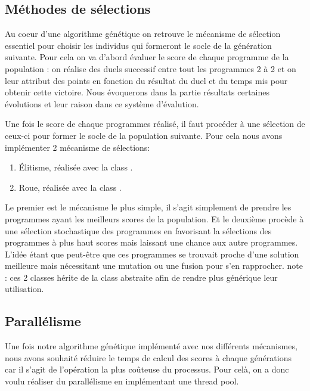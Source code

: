 \documentclass[a4paper,12pt]{article} %
\begin{document}
\subsection{Méthodes de sélections}
Au coeur d'une algorithme génétique on retrouve le mécanisme de sélection essentiel pour choisir les individus qui formeront le socle de la génération suivante.
Pour cela on va d'abord évaluer le score de chaque programme de la population : on réalise des duels successif entre tout les programmes 2 à 2 et on leur attribut des points en fonction du résultat du duel et du temps mis pour obtenir cette victoire. Nous évoquerons dans la partie résultats certaines évolutions et leur raison dans ce système d'évalution.

Une fois le score de chaque programmes réalisé, il faut procéder à une sélection de ceux-ci pour former le socle de la population suivante. Pour cela nous avons implémenter 2 mécanisme de sélections:

\begin{enumerate}
	\item Élitisme, réalisée avec la class .
	\item Roue, réalisée avec la class .
\end{enumerate}

Le premier est le mécanisme le plus simple, il s'agit simplement de prendre les programmes ayant les meilleurs scores de la population.
Et le deuxième procède à une sélection stochastique des programmes en favorisant la sélections des programmes à plus haut scores mais laissant une chance aux autre programmes. L'idée étant que peut-être que ces programmes se trouvait proche d'une solution meilleure mais nécessitant une mutation ou une fusion pour s'en rapprocher.
note : ces 2 classes hérite de la class abstraite  afin de rendre plus générique leur utilisation.

\subsection{Parallélisme}
Une fois notre algorithme génétique implémenté avec nos différents mécanismes, nous avons souhaité réduire le temps de calcul des scores à chaque générations car il s'agit de l'opération la plus coûteuse du processus. Pour celà, on a donc voulu réaliser du parallélisme en implémentant une thread pool.
\end{document}
